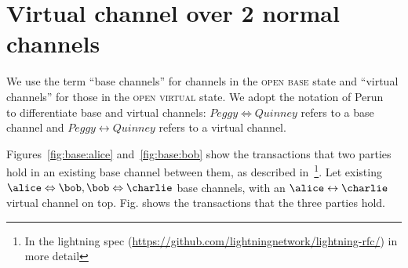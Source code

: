 \section{Virtual channel over 2 normal channels}
  We use the term ``base channels'' for channels in the \textsc{open base} state
  and ``virtual channels'' for those in the \textsc{open virtual} state. We
  adopt the notation of Perun~\cite{DBLP:conf/ccs/DziembowskiFH18} to
  differentiate base and virtual channels: $\mathit{Peggy} \Leftrightarrow
  \mathit{Quinney}$ refers to a base channel and $\mathit{Peggy} \leftrightarrow
  \mathit{Quinney}$ refers to a virtual channel.

  Figures~\ref{fig:base:alice} and~\ref{fig:base:bob} show the transactions that
  two parties hold in an existing base channel between them, as described
  in~\cite{lightning}\footnote{In the lightning spec
  (\url{https://github.com/lightningnetwork/lightning-rfc/}) in more detail}.
  Let existing $\alice \Leftrightarrow \bob, \bob \Leftrightarrow \charlie$ base
  channels, with an $\alice \leftrightarrow \charlie$ virtual channel on top.
  Fig. shows the transactions that the three parties hold.

